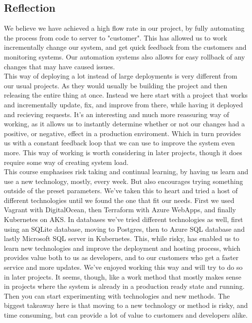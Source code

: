 \subsection{Reflection}
We believe we have achieved a high flow rate in our project, by fully automating the process from code to server to "customer".
This has allowed us to work incrementally change our system, and get quick feedback from the customers and monitoring systems.
Our automation systems also allows for easy rollback of any changes that may have caused issues.\\

This way of deploying a lot instead of large deployments is very different from our usual projects. As they would usually be building the project and then releasing the entire thing at once.
Instead we here start with a project that works and incrementally update, fix, and improve from there, while having it deployed and recieving requests.
It's an interesting and much more reassuring way of working, as it allows us to instantly determine whether or not our changes had a positive, or negative, effect in a production enviroment.
Which in turn provides us with a constant feedback loop that we can use to improve the system even more.
This way of working is worth considering in later projects, though it does require some way of creating system load.\\

This course emphasises risk taking and continual learning, by having us learn and use a new technology, mostly, every week.
But also encourages trying something outside of the preset parameters.
We've taken this to heart and tried a host of different technologies until we found the one that fit our needs. First we used Vagrant with DigitalOcean, then Terraform with Azure WebApps, and finally Kubernetes on AKS.
In databases we've tried different technologies as well, first using an SQLite database, moving to Postgres, then to Azure SQL database and lastly Microsoft SQL server in Kubernetes.
This, while risky, has enabled us to learn new technologies and improve the deployment and hosting process, which provides value both to us as developers, and to our customers who get a faster service and more updates.
We've enjoyed working this way and will try to do so in later projects.
It seems, though, like a work method that mostly makes sense in projects where the system is already in a production ready state and running.
Then you can start experimenting with technologies and new methods.
The biggest takeaway here is that moving to a new technology or method is risky, and time consuming, but can provide a lot of value to customers and developers alike.

